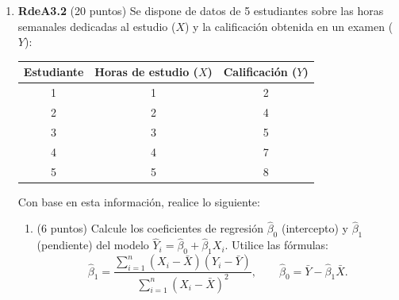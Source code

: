 \documentclass[10pt,a4paper]{article}
\begin{document}
\begin{enumerate}
{\begin{enumerate}
                \medskip
                En el contexto del problema, el $ATT$ mide el efecto causal promedio del curso de reforzamiento en las notas de quienes participan en él.
                El sesgo de selección mide la diferencia que habría entre las notas de los participantes y los no participantes en ausencia del curso de reforzamiento académico.

                \item Un intervalo de confianza de 95\% que excluye al cero solo indica que al 95\% de confianza rechazamos que los grupos de tratamiento y control tengan el mismo puntaje promedio.
                Pero, como derivamos en la parte (d), la diferencia de los puntajes promedio poblacionales entre los grupos tratamiento y control no mide necesariamente el efecto causal del tratamiento, ya que captura la suma del $ATT$ y el sesgo de selección.
                Esta diferencia de medias puede interpretarse como un efecto causal cuando el sesgo de selección es cero, es decir, cuando los grupos de tratamiento y control obtendrían en promedio el mismo puntaje en ausencia del curso de reforzamiento.
                Esto se cumpliría, por ejemplo, si la asistencia al curso fuese asignada en forma aleatoria, o en general, cuando el grupo de control provee un contrafactual válido para el grupo tratado.
            
        \end{enumerate}
        
    }

  \item \textbf{RdeA3.2} (20 puntos) 
Se dispone de datos de 5 estudiantes sobre las horas semanales dedicadas al estudio ($X$) y la calificación obtenida en un examen ($Y$):

\begin{center}
\begin{tabular}{|c|c|c|}
\hline
Estudiante & Horas de estudio ($X$) & Calificación ($Y$) \\
\hline
1 & 1 & 2 \\
2 & 2 & 4 \\
3 & 3 & 5 \\
4 & 4 & 7 \\
5 & 5 & 8 \\
\hline
\end{tabular}
\end{center}

Con base en esta información, realice lo siguiente:

\begin{enumerate}
\item (6 puntos) Calcule los coeficientes de regresión $\hat{\beta}_0$ (intercepto) y $\hat{\beta}_1$ (pendiente) del modelo $\hat{Y}_i = \hat{\beta}_0 + \hat{\beta}_1 X_i$. Utilice las fórmulas:
\[
\hat{\beta}_1 = \frac{\sum_{i=1}^{n} (X_i - \bar{X})(Y_i - \bar{Y})}{\sum_{i=1}^{n} (X_i - \bar{X})^2}, \qquad
\hat{\beta}_0 = \bar{Y} -\hat{\beta}_1 \bar{X}.
\]


\end{enumerate}
\end{enumerate}
\end{document}
